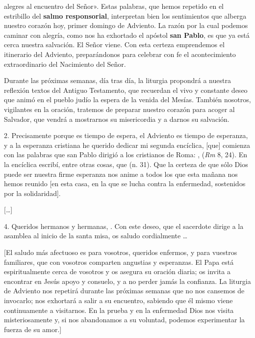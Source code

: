 \begin{body}
	 alegres al encuentro del Señor». Estas palabras, que hemos repetido en el estribillo del \textbf{salmo responsorial}, interpretan bien los sentimientos que alberga nuestro corazón hoy, primer domingo de Adviento. La razón por la cual podemos caminar con alegría, como nos ha exhortado el apóstol \textbf{san Pablo}, es que ya está cerca nuestra salvación. El Señor viene. Con esta certeza emprendemos el itinerario del Adviento, preparándonos para celebrar con fe el acontecimiento extraordinario del Nacimiento del Señor. 
	
	Durante las próximas semanas, día tras día, la liturgia propondrá a nuestra reflexión textos del Antiguo Testamento, que recuerdan el vivo y constante deseo que animó en el pueblo judío la espera de la venida del Mesías. También nosotros, vigilantes en la oración, tratemos de preparar nuestro corazón para acoger al Salvador, que vendrá a mostrarnos su misericordia y a darnos su salvación. 
	
	2. Precisamente porque es tiempo de espera, el Adviento es tiempo de esperanza, y a la esperanza cristiana he querido dedicar mi segunda encíclica, {[}que{]} comienza con las palabras que san Pablo dirigió a los cristianos de Roma: ,  (\emph{Rm} 8, 24). En la encíclica escribí, entre otras cosas, que  (n. 31). Que la certeza de que sólo Dios puede ser nuestra firme esperanza nos anime a todos los que esta mañana nos hemos reunido {[}en esta casa, en la que se lucha contra la enfermedad, sostenidos por la solidaridad{]}. 
	
	{[}\ldots{}{]} 
	
	4. Queridos hermanos y hermanas, . Con este deseo, que el sacerdote dirige a la asamblea al inicio de la santa misa, os saludo cordialmente \ldots{} 
	
	{[}El saludo más afectuoso es para vosotros, queridos enfermos, y para vuestros familiares, que con vosotros comparten angustias y esperanzas. El Papa está espiritualmente cerca de vosotros y os asegura su oración diaria; os invita a encontrar en Jesús apoyo y consuelo, y a no perder jamás la confianza. La liturgia de Adviento nos repetirá durante las próximas semanas que no nos cansemos de invocarlo; nos exhortará a salir a su encuentro, sabiendo que él mismo viene continuamente a visitarnos. En la prueba y en la enfermedad Dios nos visita misteriosamente y, si nos abandonamos a su voluntad, podemos experimentar la fuerza de su amor.{]} 
	

\end{body}
